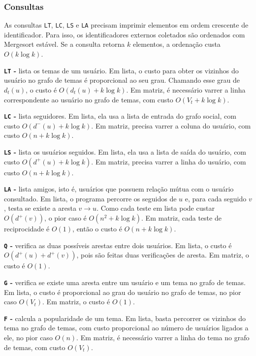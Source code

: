 \documentclass[12pt,a4paper]{article}
\begin{document}
\subsubsection{Consultas}

As consultas \texttt{LT}, \texttt{LC}, \texttt{LS} e \texttt{LA} precisam imprimir elementos
em ordem crescente de identificador. Para isso, os identificadores externos coletados são
ordenados com Mergesort estável. Se a consulta retorna $k$ elementos, a ordenação custa
$O(k \log k)$.

\textbf{\texttt{LT} -} lista os temas de um usuário. Em lista, o custo para obter os vizinhos
do usuário no grafo de temas é proporcional ao seu grau. Chamando esse grau de
$d_t(u)$, o custo é $O(d_t(u) + k \log k)$. Em matriz, é necessário varrer a linha
correspondente ao usuário no grafo de temas, com custo $O(V_t + k \log k)$.

\textbf{\texttt{LC} -} lista seguidores. Em lista, ela usa a lista de entrada do grafo social,
com custo $O(d^-(u) + k \log k)$. Em matriz, precisa varrer a coluna do usuário, com
custo $O(n + k \log k)$.

\textbf{\texttt{LS} -} lista os usuários seguidos. Em lista, ela usa a lista de saída do
usuário, com custo $O(d^+(u) + k \log k)$. Em matriz, precisa varrer a linha do usuário,
com custo $O(n + k \log k)$.

\textbf{\texttt{LA} -} lista amigos, isto é, usuários que possuem relação mútua com o
usuário consultado. Em lista, o programa percorre os seguidos de $u$ e, para cada seguido
$v$, testa se existe a aresta $v \rightarrow u$. Como cada teste em lista pode custar
$O(d^+(v))$, o pior caso é $O(n^2 + k \log k)$. Em matriz, cada teste de reciprocidade é
$O(1)$, então o custo é $O(n + k \log k)$.

\textbf{\texttt{Q} -} verifica as duas possíveis arestas entre dois usuários. Em lista, o
custo é $O(d^+(u) + d^+(v))$, pois são feitas duas verificações de aresta. Em matriz, o
custo é $O(1)$.

\textbf{\texttt{G} -} verifica se existe uma aresta entre um usuário e um tema no grafo de
temas. Em lista, o custo é proporcional ao grau do usuário no grafo de temas, no pior caso
$O(V_t)$. Em matriz, o custo é $O(1)$.

\textbf{\texttt{F} -} calcula a popularidade de um tema. Em lista, basta percorrer os
vizinhos do tema no grafo de temas, com custo proporcional ao número de usuários ligados
a ele, no pior caso $O(n)$. Em matriz, é necessário varrer a linha do tema no grafo de temas,
com custo $O(V_t)$.
\end{document}

